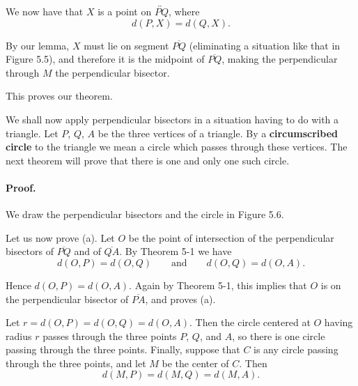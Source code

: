 \documentclass[12pt]{book} %
\begin{document}
We now have that $X$ is a point on $\overleftrightarrow{PQ}$, where
\[
d(P,X)=d(Q,X).
\]

By our lemma, $X$ must lie on segment $\overline{PQ}$ (eliminating a situation like that in Figure 5.5), and therefore it is the midpoint of $\overline{PQ}$, making the perpendicular through $M$ the perpendicular bisector.

This proves our theorem.

We shall now apply perpendicular bisectors in a situation having to do with a triangle. Let $P$, $Q$, $A$ be the three vertices of a triangle. By a \textbf{circumscribed circle} to the triangle we mean a circle which passes through these vertices. The next theorem will prove that there is one and only one such circle.


\paragraph{Proof.}
We draw the perpendicular bisectors and the circle in Figure 5.6.


Let us now prove (a). Let $O$ be the point of intersection of the perpendicular bisectors of $\overline{PQ}$ and of $\overline{QA}$. By Theorem 5-1 we have
\[
d(O,P)=d(O,Q)\qquad \text{and}\qquad d(O,Q)=d(O,A).
\]

Hence $d(O,P)=d(O,A)$. Again by Theorem 5-1, this implies that $O$ is on the perpendicular bisector of $\overline{PA}$, and proves (a).

Let $r=d(O,P)=d(O,Q)=d(O,A)$. Then the circle centered at $O$ having radius $r$ passes through the three points $P$, $Q$, and $A$, so there is one circle passing through the three points. Finally, suppose that $C$ is any circle passing through the three points, and let $M$ be the center of $C$. Then
\[
d(M,P)=d(M,Q)=d(M,A).
\]
\end{document}

